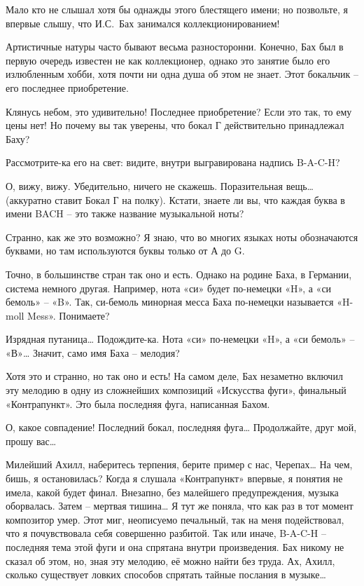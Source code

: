 \documentclass[../main.tex]{subfiles}
\begin{document}
\begin{Dialogue}
 Мало кто не слышал хотя бы однажды этого блестящего имени; но позвольте, я впервые слышу, что И.С.~Бах занимался коллекционированием!

 {\Large А}ртистичные натуры часто бывают весьма разносторонни. Конечно, Бах был в первую очередь известен не как коллекционер, однако это занятие было его излюбленным хобби, хотя почти ни одна душа об этом не знает. Этот бокальчик \--- его последнее приобретение.

 Клянусь небом, это удивительно! Последнее приобретение? Если это так, то ему цены нет! Но почему вы так уверены, что бокал Г действительно принадлежал Баху?

 Рассмотрите-ка его на свет: видите, внутри выгравирована надпись \mbox{B-A-C-H}?

 О, вижу, вижу. Убедительно, ничего не скажешь. Поразительная вещь\ldots{} (аккуратно ставит Бокал Г на полку). Кстати, знаете ли вы, что каждая буква в имени BACH \--- это также название музыкальной ноты?

 Странно, как же это возможно? Я знаю, что во многих языках ноты обозначаются буквами, но там используются буквы только от А до G.

 Точно, в большинстве стран так оно и есть. Однако на родине Баха, в Германии, система немного другая. Например, нота «си» будет по-немецки «H», а «си бемоль» \--- «B». Так, си-бемоль минорная месса Баха по-немецки называется «H-moll Mess». Понимаете?

 Изрядная путаница\ldots{} Подождите-ка. Нота «си» по-немецки «H», а «си бемоль» \--- «В»\ldots{} Значит, само имя Баха \--- мелодия?

 Хотя это и странно, но так оно и есть! На самом деле, Бах незаметно включил эту мелодию в одну из сложнейших композиций «Искусства фуги», финальный «Контрапункт». Это была последняя фуга, написанная Бахом.

 О, какое совпадение! Последний бокал, последняя фуга\ldots{} Продолжайте, друг мой, прошу вас\ldots{}

 Милейший Ахилл, наберитесь терпения, берите пример с нас, Черепах\ldots{} На чем, бишь, я остановилась? Когда я слушала «Контрапункт» впервые, я понятия не имела, какой будет финал. Внезапно, без малейшего предупреждения, музыка оборвалась. Затем \--- мертвая тишина\ldots{} Я тут же поняла, что как раз в тот момент композитор умер. Этот миг, неописуемо печальный, так на меня подействовал, что я почувствовала себя совершенно разбитой. Так или иначе, \mbox{B-A-C-H} \--- последняя тема этой фуги и она спрятана внутри произведения. Бах никому не сказал об этом, но, зная эту мелодию, её можно найти без труда. Ах, Ахилл, сколько существует ловких способов спрятать тайные послания в музыке\ldots{}


\end{Dialogue}
\end{document}
